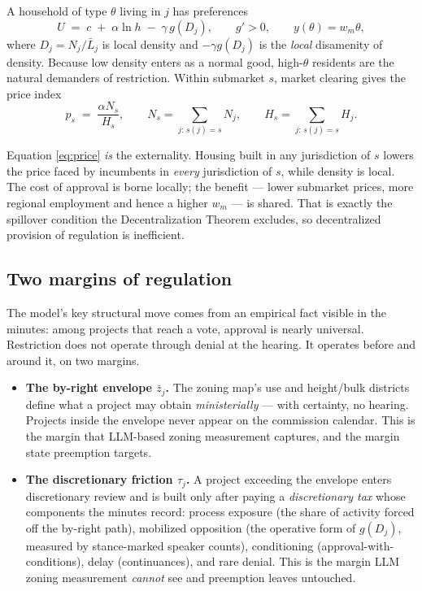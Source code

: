 \documentclass[11pt]{article}
\begin{document}
A household of type $\theta$ living in $j$ has preferences
\[
  U \;=\; c \;+\; \alpha \ln h \;-\; \gamma\, g(D_j), \qquad g' > 0,
  \qquad y(\theta) = w_m \theta ,
\]
where $D_j = N_j / \bar L_j$ is local density and $-\gamma g(D_j)$ is the \emph{local} disamenity of
density. Because low density enters as a normal good, high-$\theta$ residents are the natural
demanders of restriction. Within submarket $s$, market clearing gives the price index
\begin{equation}
  p_s \;=\; \frac{\alpha N_s}{H_s},
  \qquad N_s = \!\!\sum_{j:\, s(j)=s}\!\! N_j,
  \qquad H_s = \!\!\sum_{j:\, s(j)=s}\!\! H_j .
  \label{eq:price}
\end{equation}

\noindent Equation \eqref{eq:price} \emph{is} the externality. Housing built in any jurisdiction of
$s$ lowers the price faced by incumbents in \emph{every} jurisdiction of $s$, while density is local.
The cost of approval is borne locally; the benefit --- lower submarket prices, more regional
employment and hence a higher $w_m$ --- is shared. That is exactly the spillover condition the
Decentralization Theorem excludes, so decentralized provision of regulation is inefficient.

\subsection{Two margins of regulation}

The model's key structural move comes from an empirical fact visible in the minutes: among projects
that reach a vote, approval is nearly universal. Restriction does not operate through denial at the
hearing. It operates before and around it, on two margins.

\begin{itemize}
\item \textbf{The by-right envelope $\bar z_j$.} The zoning map's use and height/bulk districts
define what a project may obtain \emph{ministerially} --- with certainty, no hearing. Projects
inside the envelope never appear on the commission calendar. This is the margin that LLM-based
zoning measurement captures, and the margin state preemption targets.
\item \textbf{The discretionary friction $\tau_j$.} A project exceeding the envelope enters
discretionary review and is built only after paying a \emph{discretionary tax} whose components the
minutes record: process exposure (the share of activity forced off the by-right path), mobilized
opposition (the operative form of $g(D_j)$, measured by stance-marked speaker counts), conditioning
(approval-with-conditions), delay (continuances), and rare denial. This is the margin LLM zoning
measurement \emph{cannot} see and preemption leaves untouched.
\end{itemize}
\end{document}

